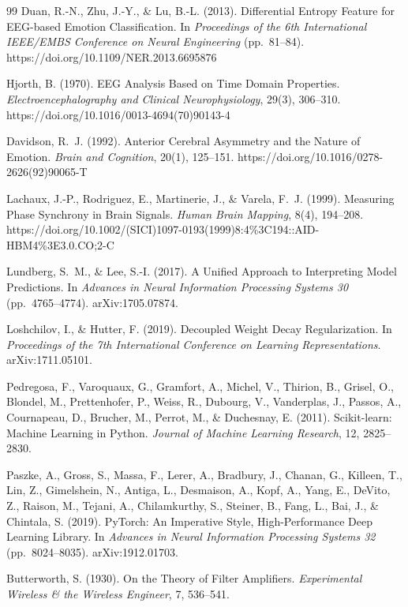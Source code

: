 \documentclass[11pt]{report}
\begin{document}
\begin{thebibliography}{99}
Duan, R.-N., Zhu, J.-Y., \& Lu, B.-L. (2013). Differential Entropy Feature
for EEG-based Emotion Classification. In \emph{Proceedings of the 6th
International IEEE/EMBS Conference on Neural Engineering} (pp.\ 81--84).
https://doi.org/10.1109/NER.2013.6695876

Hjorth, B. (1970). EEG Analysis Based on Time Domain Properties.
\emph{Electroencephalography and Clinical Neurophysiology}, 29(3), 306--310.
https://doi.org/10.1016/0013-4694(70)90143-4

Davidson, R.~J. (1992). Anterior Cerebral Asymmetry and the Nature of
Emotion. \emph{Brain and Cognition}, 20(1), 125--151.
https://doi.org/10.1016/0278-2626(92)90065-T

Lachaux, J.-P., Rodriguez, E., Martinerie, J., \& Varela, F.~J. (1999).
Measuring Phase Synchrony in Brain Signals. \emph{Human Brain Mapping},
8(4), 194--208.
https://doi.org/10.1002/(SICI)1097-0193(1999)8:4\%3C194::AID-HBM4\%3E3.0.CO;2-C

Lundberg, S.~M., \& Lee, S.-I. (2017). A Unified Approach to Interpreting
Model Predictions. In \emph{Advances in Neural Information Processing
Systems 30} (pp.\ 4765--4774). arXiv:1705.07874.

Loshchilov, I., \& Hutter, F. (2019). Decoupled Weight Decay Regularization.
In \emph{Proceedings of the 7th International Conference on Learning
Representations}. arXiv:1711.05101.

Pedregosa, F., Varoquaux, G., Gramfort, A., Michel, V., Thirion, B., Grisel,
O., Blondel, M., Prettenhofer, P., Weiss, R., Dubourg, V., Vanderplas, J.,
Passos, A., Cournapeau, D., Brucher, M., Perrot, M., \& Duchesnay, E.
(2011). Scikit-learn: Machine Learning in Python. \emph{Journal of Machine
Learning Research}, 12, 2825--2830.

Paszke, A., Gross, S., Massa, F., Lerer, A., Bradbury, J., Chanan, G.,
Killeen, T., Lin, Z., Gimelshein, N., Antiga, L., Desmaison, A., Kopf, A.,
Yang, E., DeVito, Z., Raison, M., Tejani, A., Chilamkurthy, S., Steiner, B.,
Fang, L., Bai, J., \& Chintala, S. (2019). PyTorch: An Imperative Style,
High-Performance Deep Learning Library. In \emph{Advances in Neural
Information Processing Systems 32} (pp.\ 8024--8035). arXiv:1912.01703.

Butterworth, S. (1930). On the Theory of Filter Amplifiers.
\emph{Experimental Wireless \& the Wireless Engineer}, 7, 536--541.

\end{thebibliography}
\end{document}
